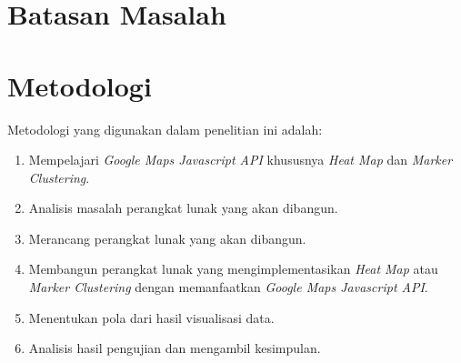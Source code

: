 \section{Batasan Masalah}
\label{sec:batasan}

\section{Metodologi}
\label{sec:metlit}
Metodologi yang digunakan dalam penelitian ini adalah:
	\begin{enumerate}

		\item Mempelajari \textit{Google Maps Javascript API} khususnya \textit{Heat Map} dan \textit{Marker Clustering}.
		\item Analisis masalah perangkat lunak yang akan dibangun.
		\item Merancang perangkat lunak yang akan dibangun.
		\item Membangun perangkat lunak yang mengimplementasikan \textit{Heat Map} atau \textit{Marker Clustering} dengan memanfaatkan \textit{Google Maps Javascript API}.
		\item Menentukan pola dari hasil visualisasi data.
		\item Analisis hasil pengujian dan mengambil kesimpulan.
	\end{enumerate}


